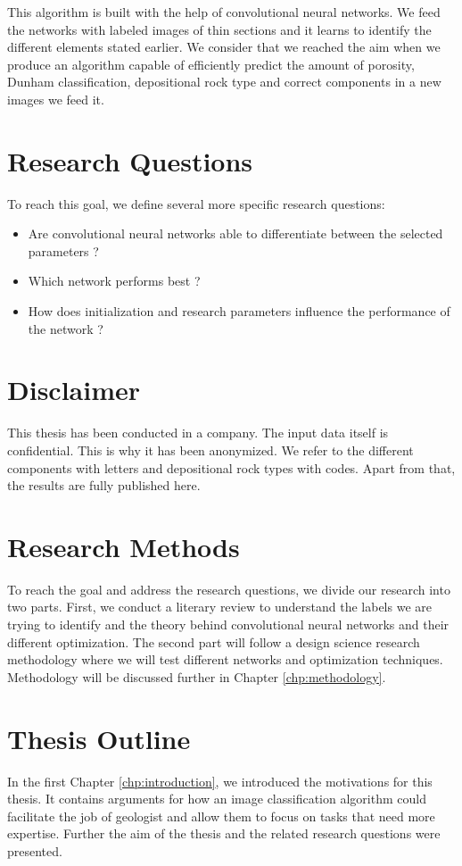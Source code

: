 This algorithm is built with the help of convolutional neural networks. We feed the networks with labeled images of thin sections and it learns to identify the different elements stated earlier. We consider that we reached the aim when we produce an algorithm capable of efficiently predict the amount of porosity, Dunham classification, depositional rock type and correct components in a new images we feed it. 

\section{Research Questions}
To reach this goal, we define several more specific research questions: 
\begin{itemize}
    \item Are convolutional neural networks able to differentiate between the selected parameters ?
    \item Which network performs best ?
    \item How does initialization and research parameters influence the performance of the network ?
\end{itemize}

\section{Disclaimer}
This thesis has been conducted in a company. The input data itself is confidential. This is why it has been anonymized. We refer to the different components with letters and depositional rock types with codes. Apart from that, the results are fully published here.  
\section{Research Methods}\label{sec:research-method}
To reach the goal and address the research questions, we divide our research into two parts. First, we conduct a literary review to understand the labels we are trying to identify and the theory behind convolutional neural networks and their different optimization. The second part will follow a design science research methodology where we will test different networks and optimization techniques. Methodology will be discussed further in Chapter \ref{chp:methodology}.
\section{Thesis Outline}

In the first Chapter \ref{chp:introduction}, we introduced the motivations for this thesis. It contains arguments for how an image classification algorithm could facilitate the job of geologist and allow them to focus on tasks that need more expertise. Further the aim of the thesis and the related research questions were presented. 


